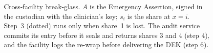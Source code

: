 \begin{figure}[!t]
\caption{Cross-facility break-glass. $A$ is the Emergency Assertion, signed in
the custodian with the clinician's key; $s_i$ is the share at $x=i$. Step~3
(dotted) runs only when share~1 is lost. The audit service commits its entry
before it seals and returns shares 3 and 4 (step 4), and the facility logs
the re-wrap before delivering the DEK (step 6).}
\label{fig:sequence}
\end{figure}

